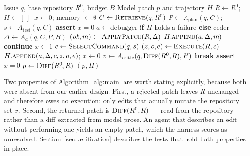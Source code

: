 \documentclass[journal]{IEEEtran}
\begin{document}
\begin{algorithm}[t]
\caption{AgentForge repair loop. The execution flag $x$ is owned by the orchestrator, not by the plan; line~\ref{line:guard} is an assertion that fails the run rather than a branch the Planner can influence.}
\label{alg:main}
\begin{algorithmic}[1]
\REQUIRE Issue $q$, base repository $R^0$, budget $B$
\ENSURE Model patch $p$ and trajectory $H$
\STATE $R \leftarrow R^0$; $H \leftarrow [\,]$; $x \leftarrow 0$; memory $\leftarrow \emptyset$
\STATE $C \leftarrow \textsc{Retrieve}(q,R^0)$ 
\STATE $P \leftarrow A_{\mathrm{plan}}(q,C)$; $s \leftarrow A_{\mathrm{test}}(q,C)$
    \STATE \textbf{assert} $x=0$ \label{line:guard}
    \STATE $a \leftarrow \mathrm{debugger}$ \textbf{if} $H$ holds a failure \textbf{else} $\mathrm{coder}$
    \STATE $\Delta \leftarrow A_a(q,C,P,H)$
    \STATE $(\mathit{ok},m) \leftarrow \textsc{ApplyPatch}(R,\Delta)$
        \STATE $H.\textsc{append}(a,\Delta,m)$ 
        \STATE \textbf{continue}
    \ENDIF
    \STATE $x \leftarrow 1$ 
    \STATE $c \leftarrow \textsc{SelectCommand}(q,s)$ 
    \STATE $(z,o,e) \leftarrow \textsc{Execute}(R,c)$
    \STATE $H.\textsc{append}(a,\Delta,c,z,o,e)$; $x \leftarrow 0$
        \STATE $v \leftarrow A_{\mathrm{critic}}(q,\textsc{Diff}(R^0,R),H)$
         \STATE \textbf{break} \ENDIF
    \ENDIF
\ENDWHILE
\STATE \textbf{assert} $x=0$ 
\STATE $p \leftarrow \textsc{Diff}(R^0,R)$ 
\RETURN $(p,H)$
\end{algorithmic}
\end{algorithm}

Two properties of Algorithm~\ref{alg:main} are worth stating explicitly, because both were absent from our earlier design. First, a rejected patch leaves $R$ unchanged and therefore owes no execution; only edits that actually mutate the repository set $x$. Second, the returned patch is $\textsc{Diff}(R^0,R)$ — read from the repository — rather than a diff extracted from model prose. An agent that describes an edit without performing one yields an empty patch, which the harness scores as unresolved. Section~\ref{sec:verification} describes the tests that hold both properties in place.
\end{document}
